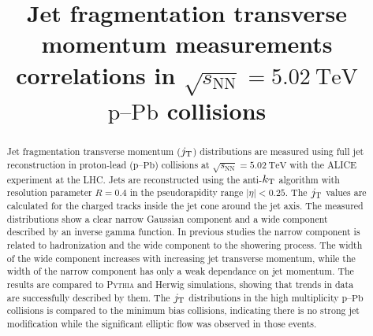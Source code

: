 \documentclass[ALICE,manyauthors]{cernphprep}
\newcommand{\pPb}{\ensuremath{\mbox{p--Pb}}}
\newcommand{\sqrtSnn}{\ensuremath{\sqrt{s_{\mathrm{NN}}}}}
\newcommand{\sqrtSnnE}[2][TeV]{\ensuremath{\sqrtSnn = #2~\mathrm{#1}}}
\def\jt#1{\ensuremath{j_{\rm T#1}}}
\def\kt#1{\ensuremath{k_{\rm T#1}}}
\begin{document}
\begin{titlepage}
%
%

\title{Jet fragmentation transverse momentum measurements correlations in $\sqrtSnnE{5.02}$ $\pPb$ collisions}


\begin{abstract}
Jet fragmentation transverse momentum ($\jt{}$) distributions are measured using full jet reconstruction in proton-lead (\pPb) collisions at $\sqrtSnnE{5.02}$ with the ALICE experiment at the LHC. Jets are reconstructed using the anti-$\kt{}$ algorithm with resolution parameter $R=0.4$ in the pseudorapidity range $|\eta|<0.25$. The $\jt{}$ values are calculated for the charged tracks inside the jet cone around the jet axis. The measured distributions show a clear narrow Gaussian component and a wide component described by an inverse gamma function. In previous studies the narrow component is related to hadronization and the wide component to the showering process. The width of the wide component increases with increasing jet transverse momentum, while the width of the narrow component has only a weak dependance on jet momentum. The results are compared to \textsc{Pythia} and Herwig simulations, showing that trends in data are successfully described by them. The $\jt{}$ distributions in the high multiplicity $\pPb$ collisions is compared to the minimum bias collisions, indicating there is no strong jet modification while the significant elliptic flow was observed in those events.
\end{abstract}
\end{titlepage}
\setcounter{page}{2}




\newpage
\end{document}
